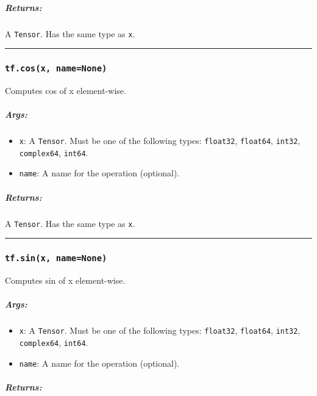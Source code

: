\subparagraph{Returns: }\label{returns-20}

A \texttt{Tensor}. Has the same type as \texttt{x}.

\begin{center}\rule{0.5\linewidth}{\linethickness}\end{center}

\subsubsection{\texorpdfstring{\texttt{tf.cos(x,\ name=None)}
}{tf.cos(x, name=None) }}\label{tf.cosx-namenone}

Computes cos of x element-wise.

\subparagraph{Args: }\label{args-21}

\begin{itemize}
\tightlist
\item
  \texttt{x}: A \texttt{Tensor}. Must be one of the following types:
  \texttt{float32}, \texttt{float64}, \texttt{int32},
  \texttt{complex64}, \texttt{int64}.
\item
  \texttt{name}: A name for the operation (optional).
\end{itemize}

\subparagraph{Returns: }\label{returns-21}

A \texttt{Tensor}. Has the same type as \texttt{x}.

\begin{center}\rule{0.5\linewidth}{\linethickness}\end{center}

\subsubsection{\texorpdfstring{\texttt{tf.sin(x,\ name=None)}
}{tf.sin(x, name=None) }}\label{tf.sinx-namenone}

Computes sin of x element-wise.

\subparagraph{Args: }\label{args-22}

\begin{itemize}
\tightlist
\item
  \texttt{x}: A \texttt{Tensor}. Must be one of the following types:
  \texttt{float32}, \texttt{float64}, \texttt{int32},
  \texttt{complex64}, \texttt{int64}.
\item
  \texttt{name}: A name for the operation (optional).
\end{itemize}

\subparagraph{Returns: }\label{returns-22}

